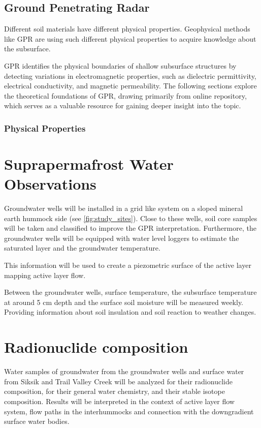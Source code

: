 \subsection{Ground Penetrating Radar}
Different soil materials have different physical properties. 
Geophysical methods like GPR are using such different physical properties to acquire knowledge about the subsurface.

GPR identifies the physical boundaries of shallow subsurface structures by detecting variations in electromagnetic properties, such as dielectric permittivity, electrical conductivity, and magnetic permeability. 
The following sections explore the theoretical foundations of GPR, drawing primarily from \citet{geoscidevelopersGroundPenetratingRadar2017} online repository, which serves as a valuable resource for gaining deeper insight into the topic.
\subsubsection{Physical Properties}

\section{Suprapermafrost Water Observations}
Groundwater wells will be installed in a grid like system on a sloped mineral earth hummock side (see \cref{fig:study_sites}). 
Close to these wells, soil core samples will be taken and classified to improve the GPR interpretation. 
Furthermore, the groundwater wells will be equipped with water level loggers to estimate the saturated layer and the groundwater temperature. 

This information will be used to create a piezometric surface of the active layer mapping active layer flow.

Between the groundwater wells, surface temperature, the subsurface temperature at around 5 cm depth and the surface soil moisture will be measured weekly. 
Providing information about soil insulation and soil reaction to weather changes.
\section{Radionuclide composition}
Water samples of groundwater from the groundwater wells and surface water from Siksik and Trail Valley Creek will be analyzed for their radionuclide composition, for their general water chemistry, and their stable isotope composition. 
Results will be interpreted in the context of active layer flow system, flow paths in the interhummocks and connection with the downgradient surface water bodies. 
